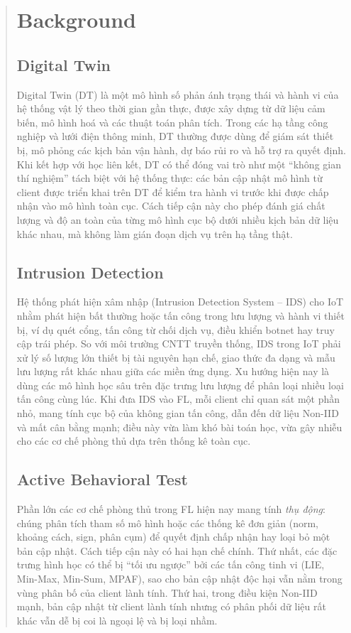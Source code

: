 \documentclass[runningheads]{llncs}
\begin{document}
\begin{abstract}
\section{Background}


\subsection{Digital Twin}

Digital Twin (DT) là một mô hình số phản ánh trạng thái và hành vi của hệ thống vật lý theo thời gian gần thực, được xây dựng từ dữ liệu cảm biến, mô hình hoá và các thuật toán phân tích. Trong các hạ tầng công nghiệp và lưới điện thông minh, DT thường được dùng để giám sát thiết bị, mô phỏng các kịch bản vận hành, dự báo rủi ro và hỗ trợ ra quyết định. Khi kết hợp với học liên kết, DT có thể đóng vai trò như một ``không gian thí nghiệm'' tách biệt với hệ thống thực: các bản cập nhật mô hình từ client được triển khai trên DT để kiểm tra hành vi trước khi được chấp nhận vào mô hình toàn cục. Cách tiếp cận này cho phép đánh giá chất lượng và độ an toàn của từng mô hình cục bộ dưới nhiều kịch bản dữ liệu khác nhau, mà không làm gián đoạn dịch vụ trên hạ tầng thật.

\subsection{Intrusion Detection}

Hệ thống phát hiện xâm nhập (Intrusion Detection System -- IDS) cho IoT nhằm phát hiện bất thường hoặc tấn công trong lưu lượng và hành vi thiết bị, ví dụ quét cổng, tấn công từ chối dịch vụ, điều khiển botnet hay truy cập trái phép. So với môi trường CNTT truyền thống, IDS trong IoT phải xử lý số lượng lớn thiết bị tài nguyên hạn chế, giao thức đa dạng và mẫu lưu lượng rất khác nhau giữa các miền ứng dụng. Xu hướng hiện nay là dùng các mô hình học sâu trên đặc trưng lưu lượng để phân loại nhiều loại tấn công cùng lúc. Khi đưa IDS vào FL, mỗi client chỉ quan sát một phần nhỏ, mang tính cục bộ của không gian tấn công, dẫn đến dữ liệu Non-IID và mất cân bằng mạnh; điều này vừa làm khó bài toán học, vừa gây nhiễu cho các cơ chế phòng thủ dựa trên thống kê toàn cục.

\subsection{Active Behavioral Test}

Phần lớn các cơ chế phòng thủ trong FL hiện nay mang tính \emph{thụ động}: chúng phân tích tham số mô hình hoặc các thống kê đơn giản (norm, khoảng cách, sign, phân cụm) để quyết định chấp nhận hay loại bỏ một bản cập nhật. Cách tiếp cận này có hai hạn chế chính. Thứ nhất, các đặc trưng hình học có thể bị ``tối ưu ngược'' bởi các tấn công tinh vi (LIE, Min-Max, Min-Sum, MPAF), sao cho bản cập nhật độc hại vẫn nằm trong vùng phân bố của client lành tính. Thứ hai, trong điều kiện Non-IID mạnh, bản cập nhật từ client lành tính nhưng có phân phối dữ liệu rất khác vẫn dễ bị coi là ngoại lệ và bị loại nhầm.


\end{abstract}
\end{document}
